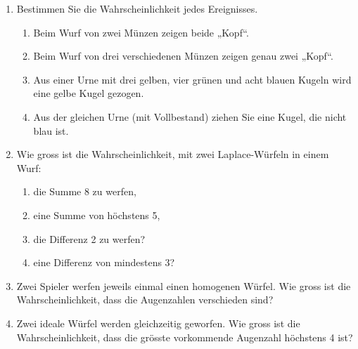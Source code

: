 \begin{ueb}
\begin{enumerate}
        \item Bestimmen Sie die Wahrscheinlichkeit jedes Ereignisses.
        \begin{enumerate}
            \item Beim Wurf von zwei Münzen zeigen beide „Kopf“.
            \item Beim Wurf von drei verschiedenen Münzen zeigen genau zwei „Kopf“.
            \item Aus einer Urne mit drei gelben, vier grünen und acht blauen Kugeln wird eine gelbe Kugel gezogen.
            \item Aus der gleichen Urne (mit Vollbestand) ziehen Sie eine Kugel, die nicht blau ist.
        \end{enumerate}
        
        \item Wie gross ist die Wahrscheinlichkeit, mit zwei Laplace-Würfeln in einem Wurf:
        \begin{enumerate}
            \item die Summe 8 zu werfen,
        
            \item eine Summe von höchstens 5,
            \item die Differenz 2 zu werfen?
            \item eine Differenz von mindestens 3?
        \end{enumerate}
        
        \item Zwei Spieler werfen jeweils einmal einen homogenen Würfel. Wie gross ist die Wahrscheinlichkeit, dass die Augenzahlen verschieden sind?
        
        \item Zwei ideale Würfel werden gleichzeitig geworfen. Wie gross ist die Wahrscheinlichkeit, dass die grösste vorkommende Augenzahl höchstens 4 ist?
        

\end{enumerate}
\end{ueb}
